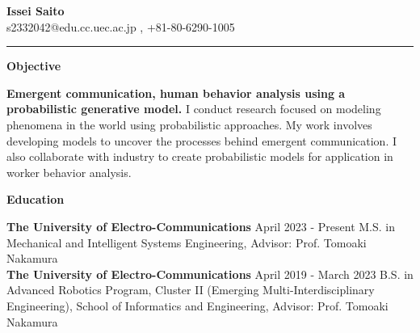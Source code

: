 \documentclass[a4paper,10pt]{article}
\begin{document}
\begin{center}
    \textbf{\LARGE Issei Saito} \\
    s2332042@edu.cc.uec.ac.jp , +81-80-6290-1005
\end{center}

\noindent\rule{\textwidth}{1.5pt}

\noindent
\begin{minipage}[t]{0.3\textwidth}
    \textbf{Objective}
\end{minipage}%
\begin{minipage}[t]{0.7\textwidth}
    \textbf{Emergent communication, human behavior analysis using a probabilistic generative model.} \newline
    I conduct research focused on modeling phenomena in the world using probabilistic approaches. My work involves developing models to uncover the processes behind emergent communication. I also collaborate with industry to create probabilistic models for application in worker behavior analysis. \newline
\end{minipage}

\vspace{10pt}

\noindent
\begin{minipage}[t]{0.3\textwidth}
    \textbf{Education}
\end{minipage}%
\begin{minipage}[t]{0.7\textwidth}
    \textbf{The University of Electro-Communications} \hfill April 2023 - Present \newline
    M.S. in Mechanical and Intelligent Systems Engineering, \newline
    Advisor: Prof. Tomoaki Nakamura \newline\\
    \textbf{The University of Electro-Communications} \hfill April 2019 - March 2023 \newline
    B.S. in Advanced Robotics Program, Cluster II (Emerging Multi-Interdisciplinary Engineering), School of Informatics and Engineering, \newline
    Advisor: Prof. Tomoaki Nakamura \newline
\end{minipage}

\vspace{10pt}
\end{document}

